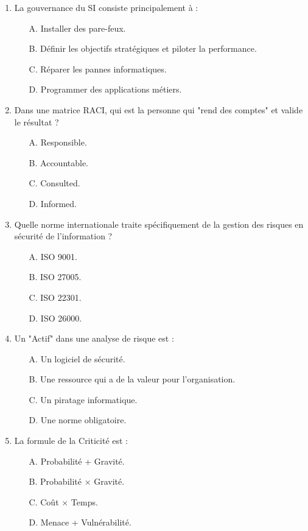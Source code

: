 \begin{enumerate}
    \item La gouvernance du SI consiste principalement à :
    \begin{itemize}
        \item[A.] Installer des pare-feux.
        \item[B.] Définir les objectifs stratégiques et piloter la performance.
        \item[C.] Réparer les pannes informatiques.
        \item[D.] Programmer des applications métiers.
    \end{itemize}

    \item Dans une matrice RACI, qui est la personne qui "rend des comptes" et valide le résultat ?
    \begin{itemize}
        \item[A.] Responsible.
        \item[B.] Accountable.
        \item[C.] Consulted.
        \item[D.] Informed.
    \end{itemize}

    \item Quelle norme internationale traite spécifiquement de la gestion des risques en sécurité de l'information ?
    \begin{itemize}
        \item[A.] ISO 9001.
        \item[B.] ISO 27005.
        \item[C.] ISO 22301.
        \item[D.] ISO 26000.
    \end{itemize}

    \item Un "Actif" dans une analyse de risque est :
    \begin{itemize}
        \item[A.] Un logiciel de sécurité.
        \item[B.] Une ressource qui a de la valeur pour l'organisation.
        \item[C.] Un piratage informatique.
        \item[D.] Une norme obligatoire.
    \end{itemize}

    \item La formule de la Criticité est :
    \begin{itemize}
        \item[A.] Probabilité + Gravité.
        \item[B.] Probabilité $\times$ Gravité.
        \item[C.] Coût $\times$ Temps.
        \item[D.] Menace + Vulnérabilité.
    \end{itemize}


\end{enumerate}
